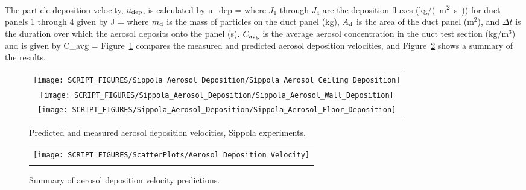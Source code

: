 \noindent The particle deposition velocity, $u_{\rm dep}$, is calculated by
\be
   u_{\rm dep} = 
\ee
where $J_1$ through $J_4$ are the deposition fluxes (\si{kg/(m^2.s)}) for duct panels 1 through 4 given by
\be
   J = 
\ee
where $m_{\rm d}$ is the mass of particles on the duct panel (kg), $A_{\rm d}$ is the area of the duct panel (m$^2$),
and $\Delta t$ is the duration over which the aerosol deposits onto the panel (s). $C_{\rm avg}$ is the
average aerosol concentration in the duct test section (kg/m$^3$) and is given by
\be
   C_{\rm avg} = 
\ee
Figure~\ref{Sippola_Aerosol_Deposition_Velocity} compares the measured and predicted aerosol deposition velocities,
and Figure~\ref{Summary_Aerosol_Deposition_Velocity} shows a summary of the results.

\begin{figure}[p]
\begin{center}
\begin{tabular}{c}
\texttt{[image: SCRIPT\_FIGURES/Sippola\_Aerosol\_Deposition/Sippola\_Aerosol\_Ceiling\_Deposition]} \\
\texttt{[image: SCRIPT\_FIGURES/Sippola\_Aerosol\_Deposition/Sippola\_Aerosol\_Wall\_Deposition]} \\
\texttt{[image: SCRIPT\_FIGURES/Sippola\_Aerosol\_Deposition/Sippola\_Aerosol\_Floor\_Deposition]}
\end{tabular}
\end{center}
\caption[Predicted and measured aerosol deposition velocities, Sippola experiments]
{Predicted and measured aerosol deposition velocities, Sippola experiments.}
\label{Sippola_Aerosol_Deposition_Velocity}
\end{figure}

\begin{figure}[p]
\begin{center}
\begin{tabular}{c}
\texttt{[image: SCRIPT\_FIGURES/ScatterPlots/Aerosol\_Deposition\_Velocity]} \\
\vspace{0.25in} \\
\end{tabular}
\end{center}
\caption[Summary of aerosol deposition velocity predictions]
{Summary of aerosol deposition velocity predictions.}
\label{Summary_Aerosol_Deposition_Velocity}
\end{figure}


